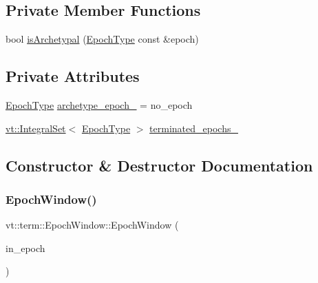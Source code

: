 \subsection*{Private Member Functions}
\begin{DoxyCompactItemize}
\item 
bool \hyperlink{structvt_1_1term_1_1_epoch_window_a82bb8b7ccf39f823d54990c04a5c24ae}{is\+Archetypal} (\hyperlink{namespacevt_a985a5adf291c34a3ca263b3378388236}{Epoch\+Type} const \&epoch)
\end{DoxyCompactItemize}
\subsection*{Private Attributes}
\begin{DoxyCompactItemize}
\item 
\hyperlink{namespacevt_a985a5adf291c34a3ca263b3378388236}{Epoch\+Type} \hyperlink{structvt_1_1term_1_1_epoch_window_a2ec27163c2e9a925fc97587364965ad3}{archetype\+\_\+epoch\+\_\+} = no\+\_\+epoch
\item 
\hyperlink{namespacevt_af8fc7210a3d8e598330cf3375857ef1e}{vt\+::\+Integral\+Set}$<$ \hyperlink{namespacevt_a985a5adf291c34a3ca263b3378388236}{Epoch\+Type} $>$ \hyperlink{structvt_1_1term_1_1_epoch_window_a08cdffaeea9d883542529b221b6c8fc9}{terminated\+\_\+epochs\+\_\+}
\end{DoxyCompactItemize}


\subsection{Constructor \& Destructor Documentation}
\mbox{\label{structvt_1_1term_1_1_epoch_window_a48e5c7c25ba6572ef86f82ee7c7af2ed}} 
\subsubsection{\texorpdfstring{Epoch\+Window()}{EpochWindow()}}
{\footnotesize\ttfamily vt\+::term\+::\+Epoch\+Window\+::\+Epoch\+Window (\begin{DoxyParamCaption}\item[{\hyperlink{namespacevt_a985a5adf291c34a3ca263b3378388236}{Epoch\+Type} const \&}]{in\+\_\+epoch }\end{DoxyParamCaption})\hspace{0.3cm}{\ttfamily [explicit]}}



